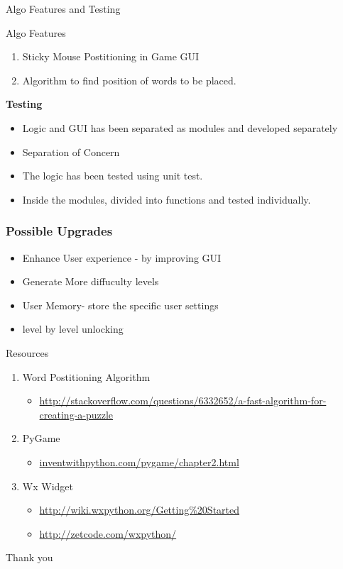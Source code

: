 \documentclass{beamer}
\begin{document}
\begin{frame}{Algo Features and Testing}
\begin{block}{Algo Features}
\begin{enumerate}
\item  Sticky Mouse Postitioning in Game GUI
\item Algorithm to find position of words to be placed. 
\end{enumerate}
\textbf{Testing}
\begin{itemize}
\item Logic and GUI has been separated as modules and developed separately
\item Separation of Concern
\item The logic has been tested using unit test.
\item Inside the modules, divided into functions and tested individually.
\end{itemize}


\end{block}


\end{frame}



\begin{frame}
\frametitle{Possible Upgrades}

\begin{itemize}
\item Enhance User experience - by improving GUI
\item Generate More diffuculty levels
\item User Memory- store the specific user settings 
\item level by level unlocking
\end{itemize}

\end{frame}


\begin{frame}{Resources}
\begin{enumerate}

\item Word Postitioning Algorithm
\begin{itemize}[]
\item \url{http://stackoverflow.com/questions/6332652/a-fast-algorithm-for-creating-a-puzzle}
\end{itemize}

\item PyGame  
\begin{itemize}[]
\item \url{inventwithpython.com/pygame/chapter2.html}

\end{itemize}

\item Wx Widget
\begin{itemize}[]
\item \url{http://wiki.wxpython.org/Getting\%20Started}
\item \url{http://zetcode.com/wxpython/}
\end{itemize}

\end{enumerate}

\end{frame}
% 

\begin{frame}
\Huge{\centerline{Thank you}}
\end{frame}
\end{document}
